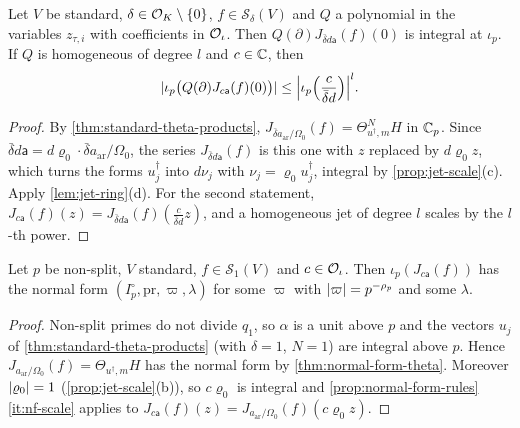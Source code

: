 \begin{theorem}\label{thm:jet-integrality}
Let $V$ be standard, $\delta\in\mathcal{O}_K\setminus\{0\}$, $f\in\mathcal S_\delta(V)$ and $Q$ a polynomial in the
variables $z_{\tau,i}$ with coefficients in $\mathcal{O}_\iota$. Then $Q(\partial)J_{\bar\delta d\mathsf a}(f)(0)$ is
integral at $\iota_p$. If $Q$ is homogeneous of degree $l$ and $c\in\mathbb{C}$, then
\[
  \lvert \iota_p\bigl(Q(\partial)J_{c\mathsf a}(f)(0)\bigr)\rvert\le\Bigl|\iota_p\Bigl(\frac c{\bar\delta d}\Bigr)\Bigr|^l .
\]
\end{theorem}

\begin{proof}
By \cref{thm:standard-theta-products}, $J_{\bar\delta a_{\mathrm{ar}}/\Omega_0}(f)=\Theta_{u^\dagger,m}^NH$ in
$\mathbb{C}_p$. Since $\bar\delta d\mathsf a=d\varrho_0\cdot\bar\delta a_{\mathrm{ar}}/\Omega_0$, the series
$J_{\bar\delta d\mathsf a}(f)$ is this one with $z$ replaced by $d\varrho_0z$, which turns the forms
$u_j^\dagger$ into $d\nu_j$ with $\nu_j=\varrho_0u_j^\dagger$, integral by \cref{prop:jet-scale}(c). Apply
\cref{lem:jet-ring}(d). For the second statement, $J_{c\mathsf a}(f)(z)=J_{\bar\delta d\mathsf a}(f)
(\frac c{\bar\delta d}z)$, and a homogeneous jet of degree $l$ scales by the $l$-th power.
\end{proof}

\begin{theorem}\label{thm:standard-normal-form}
Let $p$ be non-split, $V$ standard, $f\in\mathcal S_1(V)$ and $c\in\mathcal{O}_\iota$. Then
$\iota_p(J_{c\mathsf a}(f))$ has the normal form $(I_p^\circ,\mathrm{pr},\varpi,\lambda)$ for some $\varpi$
with $\lvert \varpi\rvert=p^{-\rho_p}$ and some $\lambda$.
\end{theorem}

\begin{proof}
Non-split primes do not divide $q_1$, so $\alpha$ is a unit above $p$ and the vectors $u_j$ of
\cref{thm:standard-theta-products} (with $\delta=1$, $N=1$) are integral above $p$. Hence
$J_{a_{\mathrm{ar}}/\Omega_0}(f)=\Theta_{u^\dagger,m}H$ has the normal form by \cref{thm:normal-form-theta}.
Moreover $\lvert \varrho_0\rvert=1$ (\cref{prop:jet-scale}(b)), so $c\varrho_0$ is integral and
\cref{prop:normal-form-rules}\ref{it:nf-scale} applies to $J_{c\mathsf a}(f)(z)=J_{a_{\mathrm{ar}}/\Omega_0}(f)
(c\varrho_0z)$.
\end{proof}

